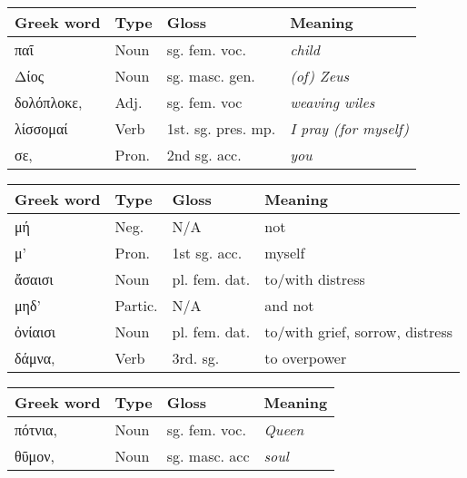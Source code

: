 \begin{table}[H]
\begin{tabular}{@{}llll@{}}
\toprule
\textbf{Greek word} & \textbf{Type} & \textbf{Gloss}     & \textbf{Meaning}             \\ \midrule
παῖ                 & Noun          & sg. fem. voc.      & \textit{child}               \\
Δίος                & Noun          & sg. masc. gen.     & \textit{(of) Zeus}           \\
δολόπλοκε,          & Adj.          & sg. fem. voc       & \textit{weaving wiles}       \\
λίσσομαί            & Verb          & 1st. sg. pres. mp. & \textit{I pray (for myself)} \\
σε,                 & Pron.         & 2nd sg. acc.       & \textit{you}                 \\ \bottomrule
\end{tabular}
\end{table}

\begin{table}[H]
\begin{tabular}{@{}llll@{}}
\toprule
\textbf{Greek word} & \textbf{Type} & \textbf{Gloss} & \textbf{Meaning}                \\ \midrule
μή                  & Neg.          & N/A            & not                             \\
μ'                  & Pron.         & 1st sg. acc.   & myself                          \\
ἄσαισι              & Noun          & pl. fem. dat.  & to/with distress                \\
μηδ'                & Partic.       & N/A            & and not                         \\
ὀνίαισι             & Noun          & pl. fem. dat.  & to/with grief, sorrow, distress \\
δάμνα,              & Verb          & 3rd. sg.       & to overpower                    \\ \bottomrule
\end{tabular}
\end{table}

\begin{table}[H]
\begin{tabular}{@{}llll@{}}
\toprule
\textbf{Greek word} & \textbf{Type} & \textbf{Gloss}     & \textbf{Meaning} \\ \midrule
πότνια,             & Noun          & sg. fem. voc. & \textit{Queen}   \\
θῦμον,              & Noun          & sg. masc. acc      & \textit{soul}    \\ \bottomrule
\end{tabular}
\end{table}

